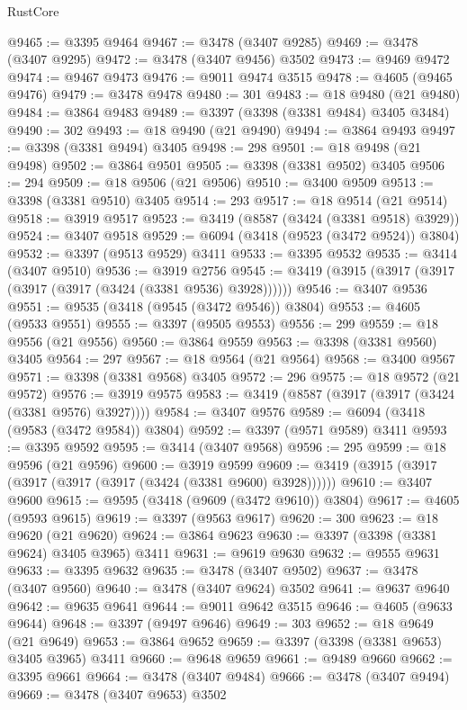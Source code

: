 \begin{lexlean}{RustCore}
\begin{coremodule}
@9465 := @3395 @9464
@9467 := @3478 (@3407 @9285)
@9469 := @3478 (@3407 @9295)
@9472 := @3478 (@3407 @9456) @3502
@9473 := @9469 @9472
@9474 := @9467 @9473
@9476 := @9011 @9474 @3515
@9478 := @4605 (@9465 @9476)
@9479 := @3478 @9478
@9480 := 301
@9483 := @18 @9480 (@21 @9480)
@9484 := @3864 @9483
@9489 := @3397 (@3398 (@3381 @9484) @3405 @3484)
@9490 := 302
@9493 := @18 @9490 (@21 @9490)
@9494 := @3864 @9493
@9497 := @3398 (@3381 @9494) @3405
@9498 := 298
@9501 := @18 @9498 (@21 @9498)
@9502 := @3864 @9501
@9505 := @3398 (@3381 @9502) @3405
@9506 := 294
@9509 := @18 @9506 (@21 @9506)
@9510 := @3400 @9509
@9513 := @3398 (@3381 @9510) @3405
@9514 := 293
@9517 := @18 @9514 (@21 @9514)
@9518 := @3919 @9517
@9523 := @3419 (@8587 (@3424 (@3381 @9518) @3929))
@9524 := @3407 @9518
@9529 := @6094 (@3418 (@9523 (@3472 @9524)) @3804)
@9532 := @3397 (@9513 @9529) @3411
@9533 := @3395 @9532
@9535 := @3414 (@3407 @9510)
@9536 := @3919 @2756
@9545 := @3419 (@3915 (@3917 (@3917 (@3917 (@3917 (@3424 (@3381 @9536) @3928))))))
@9546 := @3407 @9536
@9551 := @9535 (@3418 (@9545 (@3472 @9546)) @3804)
@9553 := @4605 (@9533 @9551)
@9555 := @3397 (@9505 @9553)
@9556 := 299
@9559 := @18 @9556 (@21 @9556)
@9560 := @3864 @9559
@9563 := @3398 (@3381 @9560) @3405
@9564 := 297
@9567 := @18 @9564 (@21 @9564)
@9568 := @3400 @9567
@9571 := @3398 (@3381 @9568) @3405
@9572 := 296
@9575 := @18 @9572 (@21 @9572)
@9576 := @3919 @9575
@9583 := @3419 (@8587 (@3917 (@3917 (@3424 (@3381 @9576) @3927))))
@9584 := @3407 @9576
@9589 := @6094 (@3418 (@9583 (@3472 @9584)) @3804)
@9592 := @3397 (@9571 @9589) @3411
@9593 := @3395 @9592
@9595 := @3414 (@3407 @9568)
@9596 := 295
@9599 := @18 @9596 (@21 @9596)
@9600 := @3919 @9599
@9609 := @3419 (@3915 (@3917 (@3917 (@3917 (@3917 (@3424 (@3381 @9600) @3928))))))
@9610 := @3407 @9600
@9615 := @9595 (@3418 (@9609 (@3472 @9610)) @3804)
@9617 := @4605 (@9593 @9615)
@9619 := @3397 (@9563 @9617)
@9620 := 300
@9623 := @18 @9620 (@21 @9620)
@9624 := @3864 @9623
@9630 := @3397 (@3398 (@3381 @9624) @3405 @3965) @3411
@9631 := @9619 @9630
@9632 := @9555 @9631
@9633 := @3395 @9632
@9635 := @3478 (@3407 @9502)
@9637 := @3478 (@3407 @9560)
@9640 := @3478 (@3407 @9624) @3502
@9641 := @9637 @9640
@9642 := @9635 @9641
@9644 := @9011 @9642 @3515
@9646 := @4605 (@9633 @9644)
@9648 := @3397 (@9497 @9646)
@9649 := 303
@9652 := @18 @9649 (@21 @9649)
@9653 := @3864 @9652
@9659 := @3397 (@3398 (@3381 @9653) @3405 @3965) @3411
@9660 := @9648 @9659
@9661 := @9489 @9660
@9662 := @3395 @9661
@9664 := @3478 (@3407 @9484)
@9666 := @3478 (@3407 @9494)
@9669 := @3478 (@3407 @9653) @3502

\end{coremodule}
\end{lexlean}
